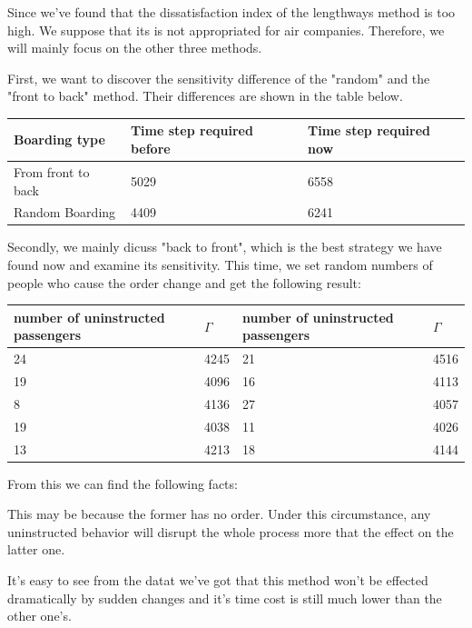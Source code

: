 \documentclass{article}
\theoremstyle{definition}
\theoremstyle{remark}
\numberwithin{equation}{section}
\begin{document}
	Since we've found that the dissatisfaction index of the lengthways method is too high. We  suppose that its is not appropriated for air companies. Therefore, we will mainly focus on the other three methods.

	First, we want to discover the sensitivity difference of the "random" and the "front to back" method. Their differences are shown in the table below.

	\begin{center}
	\begin{tabular}{||l|l|l||}
		\hline
		Boarding type&Time step required before&Time step required now\\
		\hline
		From front to back&5029&6558\\
		Random Boarding&4409&6241\\
		\hline
	\end{tabular}
	\end{center}

	Secondly, we mainly dicuss "back to front", which is the  best strategy we have found now and examine its sensitivity. This time, we set random numbers of people who cause the order change and get the following result:
	\begin{center}
	\begin{tabular}{||l|l|l|l||}
		\hline
		number of uninstructed passengers&\(\Gamma\)&number of uninstructed passengers&\(\Gamma\)\\
		\hline
		24&4245&21&4516\\
		19&4096&16&4113\\
		8&4136&27&4057\\
		19&4038&11&4026\\
		13&4213&18&4144\\
		\hline
	\end{tabular}
	\end{center}

	From this we can find the following facts:
	\begin{enumerate}
		
		This may be because the former has no order. Under this circumstance, any uninstructed behavior will disrupt the whole process more that the effect on the latter one.
		
		It's easy to see from the datat we've got that this method won't be effected dramatically by sudden changes and  it's time cost is still much lower  than the other one's. 
	\end{enumerate}
\end{document}
